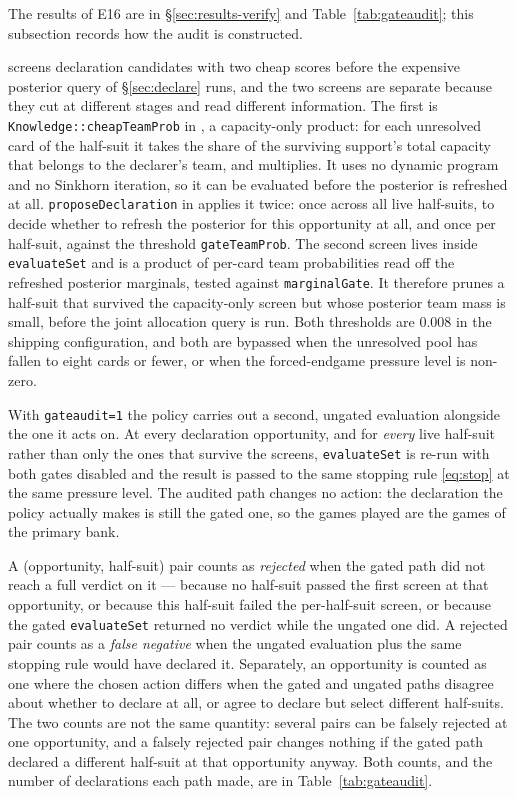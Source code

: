 The results of E16 are in \S\ref{sec:results-verify} and
Table~\ref{tab:gateaudit}; this subsection records how the audit is constructed.

\vfast{} screens declaration candidates with two cheap scores before the
expensive posterior query of \S\ref{sec:declare} runs, and the two screens are
separate because they cut at different stages and read different information.
The first is \texttt{Knowledge::cheapTeamProb} in
, a capacity-only product: for each unresolved
card of the half-suit it takes the share of the surviving support's total
capacity that belongs to the declarer's team, and multiplies. It uses no dynamic
program and no Sinkhorn iteration, so it can be evaluated before the posterior
is refreshed at all. \texttt{proposeDeclaration} in
 applies it twice: once across all live half-suits,
to decide whether to refresh the posterior for this opportunity at all, and once
per half-suit, against the threshold \texttt{gateTeamProb}. The second screen
lives inside \texttt{evaluateSet} and is a product of per-card team
probabilities read off the refreshed posterior marginals, tested against
\texttt{marginalGate}. It therefore prunes a half-suit that survived the
capacity-only screen but whose posterior team mass is small, before the joint
allocation query is run. Both thresholds are $0.008$ in the shipping
configuration, and both are bypassed when the unresolved pool has fallen to
eight cards or fewer, or when the forced-endgame pressure level is non-zero.

With \texttt{gateaudit=1} the policy carries out a second, ungated evaluation
alongside the one it acts on. At every declaration opportunity, and for
\emph{every} live half-suit rather than only the ones that survive the screens,
\texttt{evaluateSet} is re-run with both gates disabled and the result is passed
to the same stopping rule \eqref{eq:stop} at the same pressure level. The
audited path changes no action: the declaration the policy actually makes is
still the gated one, so the games played are the games of the primary bank.

A (opportunity, half-suit) pair counts as \emph{rejected} when the gated path
did not reach a full verdict on it --- because no half-suit passed the
first screen at that opportunity, or because this half-suit failed the
per-half-suit screen, or because the gated \texttt{evaluateSet} returned no
verdict while the ungated one did. A rejected pair counts as a \emph{false
negative} when the ungated evaluation plus the same stopping rule would have
declared it. Separately, an opportunity is counted as one where the chosen
action differs when the gated and ungated paths disagree about whether to
declare at all, or agree to declare but select different half-suits. The two
counts are not the same quantity: several pairs can be falsely rejected at one
opportunity, and a falsely rejected pair changes nothing if the gated path
declared a different half-suit at that opportunity anyway. Both counts, and the
number of declarations each path made, are in Table~\ref{tab:gateaudit}.

